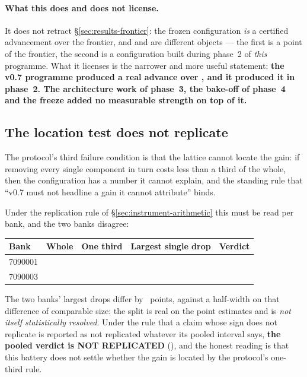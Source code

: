 \paragraph{What this does and does not license.} It does not retract
\S\ref{sec:results-frontier}: the frozen configuration \emph{is} a certified advancement over the
\vsix{} frontier, and \fcheap{} and \composite{} are different objects --- the first is a point of the
\vsix{} frontier, the second is a configuration built during phase~2 of \emph{this} programme. What it
licenses is the narrower and more useful statement: \textbf{the v0.7 programme produced a real
advance over \vsix{}, and it produced it in phase~2. The architecture work of phase~3, the bake-off of
phase~4 and the freeze added no measurable strength on top of it.}

\subsection{The location test does not replicate}
\label{sec:against-location}

The protocol's third failure condition is that the lattice cannot locate the gain: if removing every
single component in turn costs less than a third of the whole, then the configuration has a number it
cannot explain, and the standing rule that ``v0.7 must not headline a gain it cannot attribute'' binds.

Under the replication rule of \S\ref{sec:instrument-arithmetic} this must be read per bank, and the two
banks disagree:

\begin{center}\small
\begin{tabular}{lrrlc}
\toprule
Bank & Whole & One third & Largest single drop & Verdict \\
\midrule
7090001 & \vsevenLocWholeOne{} & \vsevenLocThirdOne{} & \texttt{\vsevenLocAtOne{}} \vsevenLocBiggestOne{} & \vsevenLocVerdictOne{} \\
7090003 & \vsevenLocWholeThree{} & \vsevenLocThirdThree{} & \texttt{\vsevenLocAtThree{}} \vsevenLocBiggestThree{} & \vsevenLocVerdictThree{} \\
\bottomrule
\end{tabular}
\end{center}

The two banks' largest drops differ by \vsevenLocSplit{}~points, against a half-width on that
difference of comparable size: the split is real on the point estimates and is \emph{not itself
statistically resolved}. Under the rule that a claim whose sign does not replicate is reported as not
replicated whatever its pooled interval says, \textbf{the pooled verdict is NOT REPLICATED}
(\vsevenLocReplicates{}), and the honest reading is that this battery does not settle whether the gain
is located by the protocol's one-third rule.

